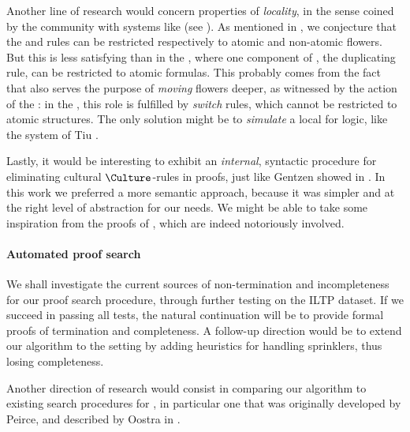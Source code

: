 Another line of research would concern properties of \emph{locality}, in the
sense coined by the  community with systems like  (see
). As mentioned in , we
conjecture that the  and  rules can be restricted
respectively to atomic and non-atomic flowers. But this is less satisfying than
in the , where one component of , the
duplicating \emph{} rule, can be restricted to atomic formulas. This
probably comes from the fact that  also serves the purpose of
\emph{moving} flowers deeper, as witnessed by the   action of
the : in the , this role is fulfilled by
\emph{switch} rules, which cannot be restricted to atomic structures. The only
solution might be to \emph{simulate} a local  for
 logic, like the system  of Tiu
.

Lastly, it would be interesting to exhibit an \emph{internal}, syntactic
procedure for eliminating cultural $\Culture$-rules in proofs, just like Gentzen
showed  in . In this work we preferred a more
semantic approach, because it was simpler and at the right level of abstraction
for our needs. We might be able to take some inspiration from the
 proofs of , which are indeed notoriously
involved.

\paragraph{Automated proof search}

We shall investigate the current sources of non-termination and incompleteness
for our  proof search procedure, through further testing on the
ILTP dataset. If we succeed in passing all tests, the natural continuation will
be to provide formal proofs of termination and completeness. A follow-up
direction would be to extend our algorithm to the  setting by adding
heuristics for handling sprinklers, thus losing completeness.

Another direction of research would consist in comparing our algorithm to
existing search procedures for , in particular one that was originally
developed by Peirce, and described by Oostra in .

